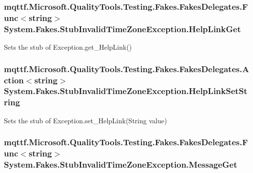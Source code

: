 \hypertarget{class_system_1_1_fakes_1_1_stub_invalid_time_zone_exception_aea317c9cf53bdcf8327bc11562971f64}{
\subsubsection[{Help\-Link\-Get}]{\setlength{\rightskip}{0pt plus 5cm}mqttf.\-Microsoft.\-Quality\-Tools.\-Testing.\-Fakes.\-Fakes\-Delegates.\-Func$<$string$>$ System.\-Fakes.\-Stub\-Invalid\-Time\-Zone\-Exception.\-Help\-Link\-Get}}\label{class_system_1_1_fakes_1_1_stub_invalid_time_zone_exception_aea317c9cf53bdcf8327bc11562971f64}


Sets the stub of Exception.\-get\-\_\-\-Help\-Link()

\hypertarget{class_system_1_1_fakes_1_1_stub_invalid_time_zone_exception_a0fe8d687f285100b3ca7ff97bca5d106}{
\subsubsection[{Help\-Link\-Set\-String}]{\setlength{\rightskip}{0pt plus 5cm}mqttf.\-Microsoft.\-Quality\-Tools.\-Testing.\-Fakes.\-Fakes\-Delegates.\-Action$<$string$>$ System.\-Fakes.\-Stub\-Invalid\-Time\-Zone\-Exception.\-Help\-Link\-Set\-String}}\label{class_system_1_1_fakes_1_1_stub_invalid_time_zone_exception_a0fe8d687f285100b3ca7ff97bca5d106}


Sets the stub of Exception.\-set\-\_\-\-Help\-Link(\-String value)

\hypertarget{class_system_1_1_fakes_1_1_stub_invalid_time_zone_exception_ae434dd80e993311dc10aab70c9606cdc}{
\subsubsection[{Message\-Get}]{\setlength{\rightskip}{0pt plus 5cm}mqttf.\-Microsoft.\-Quality\-Tools.\-Testing.\-Fakes.\-Fakes\-Delegates.\-Func$<$string$>$ System.\-Fakes.\-Stub\-Invalid\-Time\-Zone\-Exception.\-Message\-Get}}\label{class_system_1_1_fakes_1_1_stub_invalid_time_zone_exception_ae434dd80e993311dc10aab70c9606cdc}


